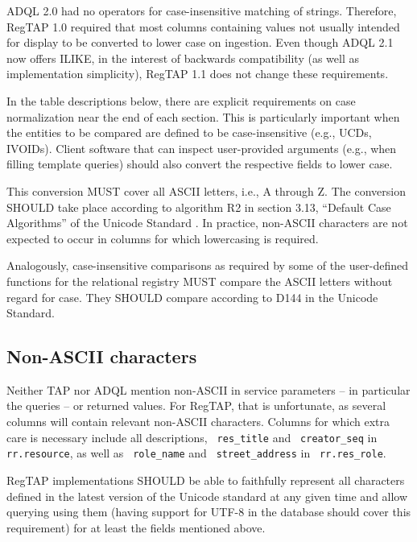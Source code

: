 \documentclass[11pt,a4paper]{ivoa}
\newcommand{\rtent}[1]{\texttt{\color{rtcolor} #1}}
\begin{document}
\label{casenorm}

ADQL 2.0 had no operators for case-insensitive matching of strings.
Therefore, RegTAP 1.0 required that most columns
containing values not usually intended for display to be
converted to lower case on ingestion.  Even though ADQL 2.1 now offers
ILIKE, in the interest of backwards compatibility (as well as
implementation simplicity), RegTAP 1.1 does not change these
requirements.

In the table descriptions below, there are
explicit requirements on case normalization near the end of each
section.  This is particularly important when the entities to be
compared are defined to be case-insensitive (e.g., UCDs, IVOIDs).
Client software that can inspect user-provided arguments (e.g., when
filling template queries) should also convert the respective fields to
lower case.

This conversion MUST cover all ASCII letters, i.e., A through Z.  
The conversion SHOULD take place according to
algorithm R2 in section 3.13, ``Default Case Algorithms'' of the Unicode
Standard
\citep{std:UNICODE}.  In practice, non-ASCII characters are not expected
to occur in columns for which lowercasing is required.

Analogously, case-insensitive comparisons as required by some of the
user-defined functions for the relational registry MUST compare
the ASCII letters without regard for case.  They SHOULD compare according
to D144 in the Unicode Standard.


\subsection{Non-ASCII characters}

\label{utfreq}

Neither TAP nor ADQL mention non-ASCII in service parameters -- in
particular the queries -- or returned values.  For RegTAP, that is
unfortunate, as several columns will contain relevant non-ASCII
characters.  Columns for which extra care is necessary include all
descriptions, \rtent{res\_title} and \rtent{creator\_seq} in
\rtent{rr.resource}, as well as \rtent{role\_name} and
\rtent{street\_address} in \rtent{rr.res\_role}.

RegTAP implementations SHOULD be able to faithfully represent all
characters defined in the latest version of the Unicode standard 
\citep{std:UNICODE} at
any given time and allow querying using them (having support for UTF-8
in the database should cover this requirement) for at least the fields
mentioned above.
\end{document}

